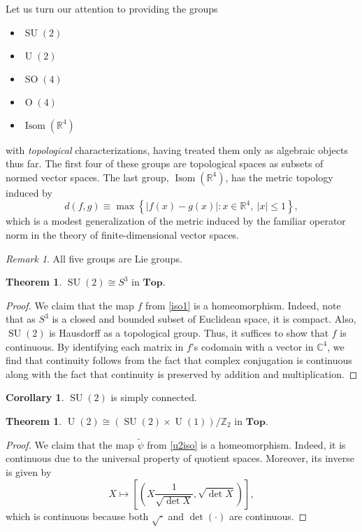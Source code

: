 \documentclass[10pt,letterpaper,cm]{nupset}
\theoremstyle{definition}
\theoremstyle{theorem}
\newtheorem{theorem}[definition]{Theorem}
\newtheorem{cor}[definition]{Corollary}
\theoremstyle{remark}
\newtheorem{remark}[definition]{Remark}
\newcommand{\C}{\mathbb C}
\newcommand{\R}{\mathbb R}
\newcommand{\Z}{\mathbb Z}
\newcommand{\1}{\mathbf{1}}
\newcommand{\0}{\vec {0}}
\DeclareMathOperator{\ORT}{O}
\DeclareMathOperator{\Isom}{Isom}
\DeclareMathOperator{\SO}{SO}
\DeclareMathOperator{\SU}{SU}
\DeclareMathOperator{\U}{U}
\begin{document}
Let us turn our attention to providing the groups
\begin{itemize}
\item $\SU(2)$
\item $\U(2)$
\item $\SO(4)$
\item $\ORT(4)$
\item $\Isom(\R^4)$
\end{itemize}
with \emph{topological} characterizations, having treated them only as algebraic objects thus far. The first four of these groups are topological spaces as subsets of normed vector spaces. The last group, $\Isom(\R^4)$, has the metric topology induced by
\[
d(f,g) \equiv \max\left\{ \left\lvert{f(x)-g(x)}\right\rvert : x \in \R^4,\ \left\lvert{x}\right\rvert \leq 1\right\},
\]  which is a modest generalization of the metric induced by the familiar operator norm in the theory of finite-dimensional vector spaces.
\begin{remark}
All five groups are Lie groups.
\end{remark}

\smallskip

\begin{theorem}
$\SU(2) \cong S^3$ in $\mathbf{Top}$. 
\end{theorem}

\begin{proof}
We claim that the map $f$ from \cref{iso1} is a homeomorphism. Indeed, note that as $S^3$ is a closed and bounded subset of Euclidean space, it is compact. Also, $\SU(2)$ is Hausdorff as a topological group. Thus, it suffices to show that $f$ is continuous. By identifying each matrix in $f$'s codomain with a vector in $\C^4$, we find that continuity follows from the fact that complex conjugation is continuous along with the fact that continuity is preserved by addition and multiplication. 
\end{proof}

\begin{cor}
$\SU(2)$ is simply connected.
\end{cor}

\medskip

\begin{theorem}
 $\U(2)\cong \left(\SU(2)\times \U(1)\right)/\Z_2$ in $\mathbf{Top}$.
\end{theorem}
\begin{proof}
We claim that the map $\tilde{\psi}$ from \cref{u2iso} is a homeomorphism. Indeed, it is  continuous due to the universal property of quotient spaces. Moreover, its inverse is given by 
\[
X\mapsto \left[\left(X\frac{1}{\sqrt{\det{X}}}, \sqrt{\det{X}}\right)\right]
,\] which is continuous because both $\sqrt{\cdot}$ and $\det(\cdot)$ are continuous.
\end{proof}
\end{document}
